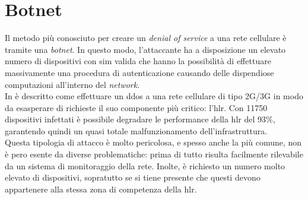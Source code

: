 \section{Botnet}
Il metodo più conosciuto per creare un \textit{denial of service} a una rete cellulare è tramite una \textit{botnet}.
In questo modo, l'attaccante ha a disposizione un elevato numero di dispositivi con \gls{sim} valida che hanno la possibilità di effettuare massivamente una procedura
di autenticazione causando delle dispendiose computazioni all'interno del \textit{network}.\\
In \cite{measuring-dos} è descritto come effettuare un \gls{ddos} a una rete cellulare di tipo 2G/3G in modo da esasperare di richieste il suo componente più critico: l'\gls{hlr}.
Con 11750 dispositivi infettati è possibile degradare le performance della \gls{hlr} del 93\%\cite{measuring-dos}, garantendo quindi un quasi totale malfunzionamento dell'infrastruttura.\\
Questa tipologia di attacco è molto pericolosa, e spesso anche la più comune, non è pero esente da diverse problematiche: prima di tutto risulta facilmente rilevabile da un sistema di 
monitoraggio della rete. Inolte, è richiesto un numero molto elevato di dispositivi, sopratutto se si tiene presente che questi devono 
appartenere alla stessa zona di competenza della \gls{hlr}.\\

